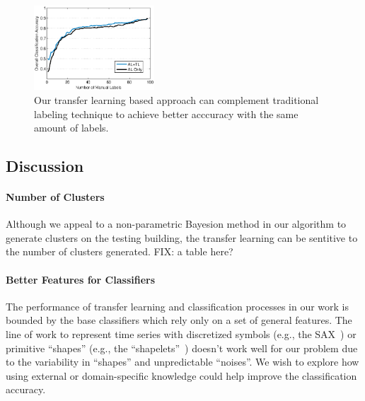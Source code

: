 \begin{figure}[t]
\centering
\includegraphics[width=0.4\textwidth]{./fig/tl_al.eps}
\caption{Our transfer learning based approach can complement traditional labeling technique to achieve better acccuracy with the same amount of labels.}
\label{fig:comp}
\end{figure}


\subsection{Discussion}
\paragraph{Number of Clusters}
Although we appeal to a non-parametric Bayesion method in our algorithm to generate clusters on the testing building, the transfer learning can be sentitive to the number of clusters generated.
FIX: a table here?

\paragraph{Better Features for Classifiers} The performance of transfer learning and classification processes in our work is bounded by the base classifiers which rely only on a set of general features. The line of work to represent time series with discretized symbols (e.g., the SAX~\cite{sax}) or primitive ``shapes'' (e.g., the ``shapelets''~\cite{shapelet1, shapelet2}) doesn't work well for our problem due to the variability in ``shapes'' and unpredictable ``noises''. We wish to explore how using external or domain-specific knowledge could help improve the classification accuracy. 

